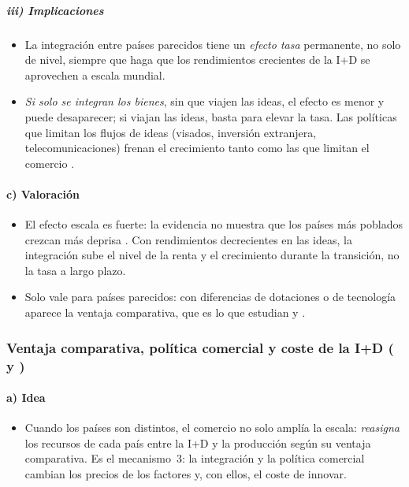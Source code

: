 \documentclass[11pt]{article}
\begin{document}
\subparagraph{iii) Implicaciones}

\begin{itemize}
\item La integración entre países parecidos tiene un \emph{efecto tasa} permanente, no solo de nivel, siempre que haga que los rendimientos crecientes de la I+D se aprovechen a escala mundial\nocite{RiveraBatizRomer1991}.
\item \emph{Si solo se integran los bienes}, sin que viajen las ideas, el efecto es menor y puede desaparecer; si viajan las ideas, basta para elevar la tasa. Las políticas que limitan los flujos de ideas (visados, inversión extranjera, telecomunicaciones) frenan el crecimiento tanto como las que limitan el comercio .
\end{itemize}

\paragraph{c) Valoración}

\begin{itemize}
\item El efecto escala es fuerte: la evidencia no muestra que los países más poblados crezcan más deprisa\nocite{Jones1995} . Con rendimientos decrecientes en las ideas, la integración sube el nivel de la renta y el crecimiento durante la transición, no la tasa a largo plazo.
\item Solo vale para países parecidos: con diferencias de dotaciones o de tecnología aparece la ventaja comparativa, que es lo que estudian  y .
\end{itemize}

\subsubsection{Ventaja comparativa, política comercial y coste de la I+D ( y )}\label{sec:grossman-helpman}

\paragraph{a) Idea}

\begin{itemize}
\item Cuando los países son distintos, el comercio no solo amplía la escala: \emph{reasigna} los recursos de cada país entre la I+D y la producción según su ventaja comparativa. Es el mecanismo~3: la integración y la política comercial cambian los precios de los factores y, con ellos, el coste de innovar\nocite{GrossmanHelpman1991}.
\end{itemize}
\end{document}
